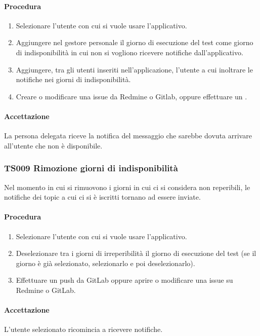 		\paragraph*{Procedura}
			\begin{enumerate}
				\item Selezionare l'utente con cui si vuole usare l'applicativo.
				\item Aggiungere nel gestore personale il giorno di esecuzione del test come giorno di indisponibilità in cui non si vogliono ricevere notifiche dall'applicativo.
				\item Aggiungere, tra gli utenti inseriti nell'applicazione, l'utente a cui inoltrare le notifiche nei giorni di indisponibilità.
				\item Creare o modificare una issue da Redmine o Gitlab, oppure effettuare un . 
			\end{enumerate}
		
		\paragraph*{Accettazione}
		La persona delegata riceve la notifica del messaggio che sarebbe dovuta arrivare all'utente che non è disponibile.
		
	\subsubsection{TS009 Rimozione giorni di indisponibilità}
		Nel momento in cui si rimuovono i giorni in cui ci si considera non reperibili, le notifiche dei topic a cui ci si è iscritti tornano ad essere inviate.
		
		\paragraph*{Procedura}
			\begin{enumerate}
				\item Selezionare l'utente con cui si vuole usare l'applicativo.
				\item Deselezionare tra i giorni di irreperibilità il giorno di esecuzione del test (se il giorno è già selezionato, selezionarlo e poi deselezionarlo).
				\item Effettuare un push da GitLab oppure aprire o modificare una issue su Redmine o GitLab.
			\end{enumerate}
		
		\paragraph*{Accettazione}
		L'utente selezionato ricomincia a ricevere notifiche.